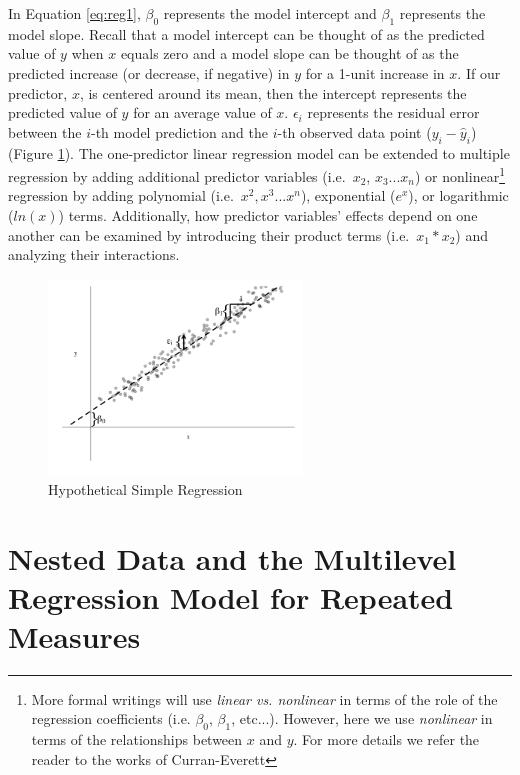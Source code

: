 \documentclass[
]{article}
\begin{document}
\noindent
In Equation \ref{eq:reg1}, \(\beta_{0}\) represents the model intercept and \(\beta_{1}\) represents the model slope. Recall that a model intercept can be thought of as the predicted value of \(y\) when \(x\) equals zero and a model slope can be thought of as the predicted increase (or decrease, if negative) in \(y\) for a 1-unit increase in \(x\). If our predictor, \(x\), is centered around its mean, then the intercept represents the predicted value of \(y\) for an average value of \(x\). \(\epsilon_{i}\) represents the residual error between the \(i\)-th model prediction and the \(i\)-th observed data point (\(y_{i}-\hat{y}_{i}\)) (Figure \ref{fig1}). The one-predictor linear regression model can be extended to multiple regression by adding additional predictor variables (i.e.~\(x_{2}\), \(x_{3}...x_{n}\)) or nonlinear\footnote{More formal writings will use \textit{linear vs. nonlinear} in terms of the role of the regression coefficients (i.e. $\beta_{0}$, $\beta_{1}$, etc...). However, here we use \textit{nonlinear} in terms of the relationships between $x$ and $y$. For more details we refer the reader to the works of Curran-Everett\cite{curran-everett2011}} regression by adding polynomial (i.e.~\(x^{2}, x^{3}...x^{n}\)), exponential (\(e^{x}\)), or logarithmic (\(ln(x)\)) terms. Additionally, how predictor variables' effects depend on one another can be examined by introducing their product terms (i.e.~\(x_{1}*x_{2}\)) and analyzing their interactions.

\begin{figure}[h]
\centering
\captionsetup{width=0.6\textwidth}
\includegraphics[width=0.6\textwidth]{fig1.png}
\caption{Hypothetical Simple Regression}
\label{fig1}
\end{figure}

\hypertarget{nested-data-and-the-multilevel-regression-model-for-repeated-measures}{%
\section{Nested Data and the Multilevel Regression Model for Repeated Measures}\label{nested-data-and-the-multilevel-regression-model-for-repeated-measures}}
\end{document}
